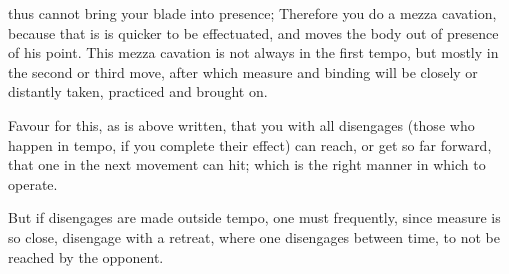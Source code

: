 \newpage


\newpage


thus cannot bring your blade into presence; Therefore you do a mezza
cavation, because that is is quicker to be effectuated, and moves the
body out of presence of his point. This mezza cavation is not always
in the first tempo, but mostly in the second or third move, after
which measure and binding will be closely or distantly taken,
practiced and brought on.


Favour for this, as is above written, that you with all disengages (those
who happen in tempo, if you complete their effect) can reach, or get
so far forward, that one in the next movement can hit; which is the
right manner in which to operate.


But if disengages are made outside tempo, one must frequently, since
measure is so close, disengage with a retreat, where one disengages between
time, to not be reached by the opponent.

